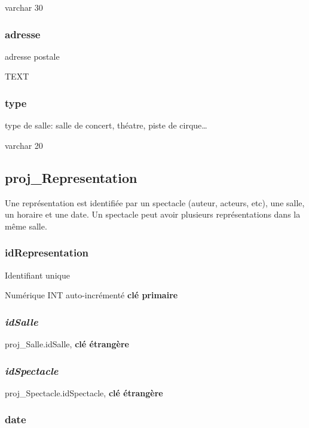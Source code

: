 varchar 30

\subsubsection{adresse}\label{adresse}

adresse postale

TEXT

\subsubsection{type}\label{type-1}

type de salle: salle de concert, théatre, piste de cirque\ldots{}

varchar 20

\subsection{proj\_Representation}\label{projux5frepresentation}

Une représentation est identifiée par un spectacle (auteur, acteurs,
etc), une salle, un horaire et une date. Un spectacle peut avoir
plusieurs représentations dans la même salle.

\subsubsection{\texorpdfstring{\textbf{idRepresentation}}{idRepresentation}}\label{idrepresentation}

Identifiant unique

Numérique INT auto-incrémenté \textbf{clé primaire}

\subsubsection{\texorpdfstring{\emph{idSalle}}{idSalle}}\label{idsalle-1}

proj\_Salle.idSalle, \textbf{clé étrangère}

\subsubsection{\texorpdfstring{\emph{idSpectacle}}{idSpectacle}}\label{idspectacle-1}

proj\_Spectacle.idSpectacle, \textbf{clé étrangère}

\subsubsection{date}\label{date}

